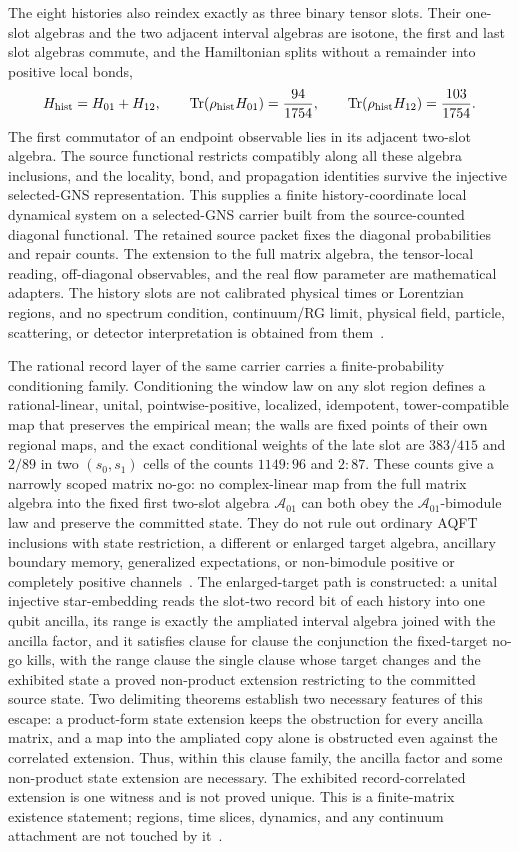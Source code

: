 \documentclass[11pt]{article}
\begin{document}
The eight histories also reindex exactly as three binary tensor slots.  Their
one-slot algebras and the two adjacent interval algebras are isotone, the
first and last slot algebras commute, and the Hamiltonian splits without a
remainder into positive local bonds,
\[
 H_{\rm hist}=H_{01}+H_{12},\qquad
 \operatorname{Tr}(\rho_{\rm hist}H_{01})=\frac{94}{1754},\qquad
 \operatorname{Tr}(\rho_{\rm hist}H_{12})=\frac{103}{1754}.
\]
The first commutator of an endpoint observable lies in its adjacent two-slot
algebra.  The source functional restricts compatibly along all these algebra
inclusions, and the locality, bond, and propagation identities survive the
injective selected-GNS representation.  This supplies a finite
history-coordinate local dynamical system on a selected-GNS carrier built
from the source-counted diagonal functional.
The retained source packet fixes the diagonal probabilities and repair
counts.  The extension to the full matrix algebra, the tensor-local reading,
off-diagonal observables, and the real flow parameter are mathematical
adapters.  The history slots are not calibrated physical times or Lorentzian
regions, and no spectrum condition, continuum/RG limit, physical field,
particle, scattering, or detector interpretation is obtained from
them~\cite{ophrepo}.

The rational record layer of the same carrier carries a finite-probability
conditioning family.  Conditioning the window law on any slot region
defines a rational-linear, unital, pointwise-positive, localized, idempotent,
tower-compatible map that preserves the empirical mean; the walls are fixed
points of their own regional maps, and the exact conditional weights of the
late slot are \(383/415\) and \(2/89\) in two \((s_0,s_1)\) cells of the
counts \(1149:96\) and \(2:87\).  These counts give a narrowly scoped matrix
no-go: no complex-linear map from the full matrix algebra into the fixed
first two-slot algebra \(\mathcal A_{01}\) can both obey the
\(\mathcal A_{01}\)-bimodule law and preserve the committed state.  They do
not rule out ordinary AQFT inclusions with state restriction, a different or
enlarged target algebra, ancillary boundary memory, generalized
expectations, or non-bimodule positive or completely positive
channels~\cite{ophrepo}.  The enlarged-target path is constructed: a unital
injective star-embedding reads the slot-two record bit of each history into
one qubit ancilla, its range is exactly the ampliated interval algebra
joined with the ancilla factor, and it satisfies clause for clause the
conjunction the fixed-target no-go kills, with the range clause the single
clause whose target changes and the exhibited state a proved non-product
extension restricting to the committed source state.  Two delimiting
theorems establish two necessary features of this escape: a product-form
state extension keeps
the obstruction for every ancilla matrix, and a map into the ampliated
copy alone is obstructed even against the correlated extension.  Thus,
within this clause family, the ancilla factor and some non-product state
extension are necessary.  The exhibited record-correlated extension is one
witness and is not proved unique.
This is a finite-matrix existence statement; regions, time slices,
dynamics, and any continuum attachment are not touched by
it~\cite{ophrepo}.
\end{document}
